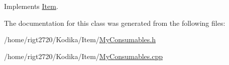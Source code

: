 Implements \hyperlink{classItem_a790283e2fb63df00eb61a95bb9921051}{Item}.



The documentation for this class was generated from the following files\-:\begin{DoxyCompactItemize}
\item 
/home/rigt2720/\-Kodika/\-Item/\hyperlink{MyConsumables_8h}{My\-Consumables.\-h}\item 
/home/rigt2720/\-Kodika/\-Item/\hyperlink{MyConsumables_8cpp}{My\-Consumables.\-cpp}\end{DoxyCompactItemize}
